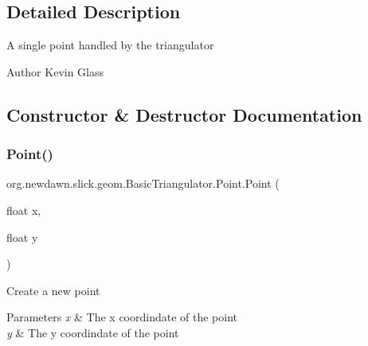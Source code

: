 \subsection{Detailed Description}
A single point handled by the triangulator

\begin{DoxyAuthor}{Author}
Kevin Glass 
\end{DoxyAuthor}


\subsection{Constructor \& Destructor Documentation}
\mbox{\label{classorg_1_1newdawn_1_1slick_1_1geom_1_1_basic_triangulator_1_1_point_aece21dc99059c02dceef8a70eb47d4cc}} 
\subsubsection{\texorpdfstring{Point()}{Point()}}
{\footnotesize\ttfamily org.\+newdawn.\+slick.\+geom.\+Basic\+Triangulator.\+Point.\+Point (\begin{DoxyParamCaption}\item[{float}]{x,  }\item[{float}]{y }\end{DoxyParamCaption})\hspace{0.3cm}{\ttfamily [inline]}}

Create a new point


\begin{DoxyParams}{Parameters}
{\em x} & The x coordindate of the point \\
\hline
{\em y} & The y coordindate of the point \\
\hline
\end{DoxyParams}

